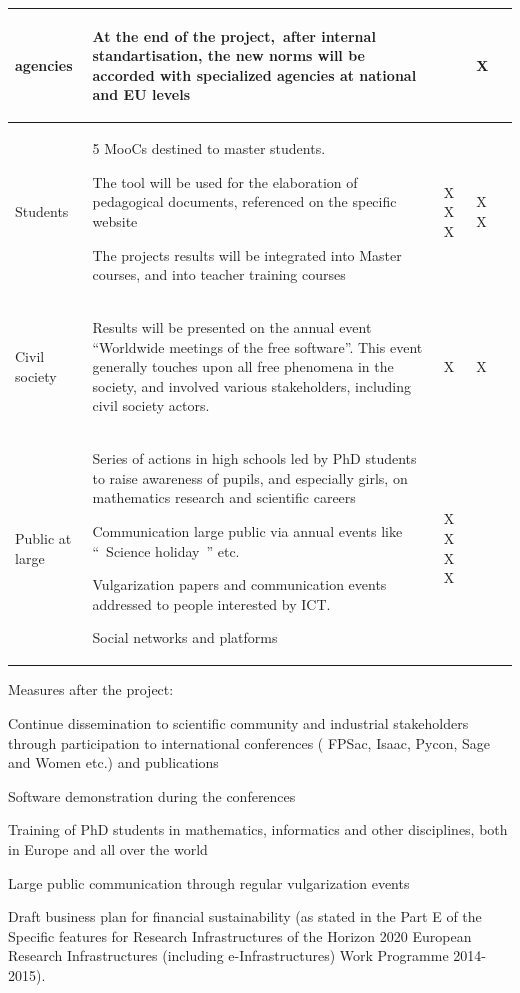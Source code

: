 \begin{flushleft}
\begin{supertabular}{|m{2cm}|m{8cm}|l|l|l|}
agencies  &
\begin{compactenum}
\item At the end of the project,~after internal standartisation, the new
norms will be accorded with specialized agencies at national and EU
levels
\end{compactenum}
 &
 &
X &
\\\hline
Students &
\begin{compactenum}
\item 5 MooCs destined to master students.\item The tool will be used
for the elaboration of pedagogical documents, referenced on the
specific website\item The projects results will be integrated into
Master courses, and into teacher training courses
\end{compactenum}
 &
X
X
X
 &
X
X &
\\\hline
Civil society &
\begin{compactenum}
\item Results will be presented on the annual event “Worldwide meetings
of the free software”. This event generally touches upon all free
phenomena in the society, and involved various stakeholders, including
civil society actors.
\end{compactenum}
 &
X &
X &
\\\hline
Public at large &
\begin{compactenum}
\item Series of actions in high schools led by PhD students to raise
awareness of pupils, and especially girls, on mathematics research and
scientific careers\item Communication large public via annual events
like ``~Science holiday~'' etc.\item Vulgarization papers and
communication events addressed to people interested by ICT. \item Social
networks and platforms
\end{compactenum}
 &
X
X
X
X &
 &
\\\hline
\end{supertabular}
\end{flushleft}
Measures after the project:

\begin{compactenum}
\item Continue dissemination to scientific community and industrial
stakeholders through participation to international conferences (
FPSac, Isaac, Pycon, Sage and Women etc.) and publications
\item Software demonstration during the conferences
\item Training of  PhD students in mathematics, informatics and other
disciplines, both in Europe and all over the world
\item Large public communication  through regular vulgarization events
\end{compactenum}
Draft business plan for financial sustainability (as stated in the Part
E of the Specific features for Research Infrastructures of the Horizon
2020 European Research Infrastructures (including e-Infrastructures)
Work Programme 2014-2015).

